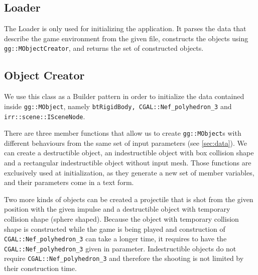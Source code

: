 \subsection*{Loader}
The Loader is only used for initializing the application. It parses the data that describe the game environment from the given file, constructs the objects using {\tt gg::MObjectCreator}, and returns the set of constructed objects.

\subsection*{Object Creator}
We use this class as a Builder pattern in order to initialize the data contained inside {\tt gg::MObject}, namely {\tt btRigidBody, CGAL::Nef\_polyhedron\_3} and {\tt irr::scene::ISceneNode}.

There are three member functions that allow us to create {\tt gg::MObject}s  with different behaviours from the same set of input parameters (see \cref{sec:data}). We can create a destructible object, an indestructible object with box collision shape and a rectangular indestructible object without input mesh. Those functions are exclusively used at initialization, as they generate a new set  of member variables, and their parameters come in a text form.

Two more kinds of objects can be created a projectile that  is shot from the given position with the given impulse and a destructible object with temporary collision shape (sphere shaped). Because the object with temporary collision shape is constructed while the game is being played and construction of {\tt CGAL::Nef\_polyhedron\_3} can take a longer time, it requires to have the {\tt CGAL::Nef\_polyhedron\_3} given in parameter. Indestructible objects do not require {\tt CGAL::Nef\_polyhedron\_3} and therefore the shooting is not limited by their construction time.

